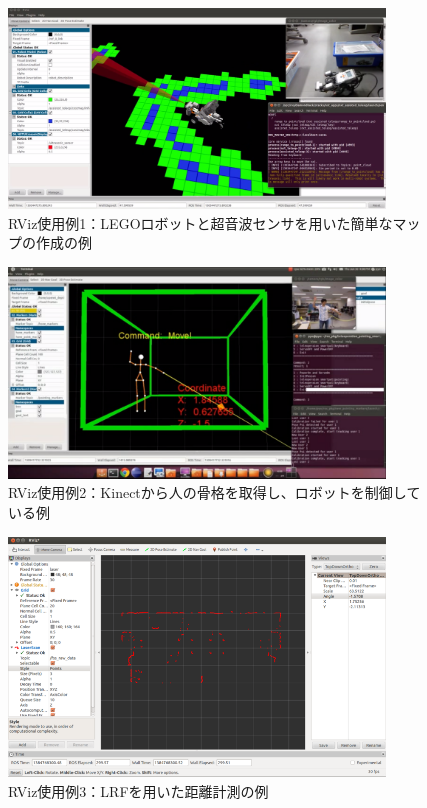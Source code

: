 \begin{figure}[h]
  \centering
  \includegraphics[width=10cm]{pictures/chapter5/pic_05_01.png}
  \caption{RViz使用例1：LEGOロボットと超音波センサを用いた簡単なマップの作成の例}
\end{figure}

\begin{figure}[h]
  \centering
  \includegraphics[width=10cm]{pictures/chapter5/pic_05_02.png}
  \caption{RViz使用例2：Kinectから人の骨格を取得し、ロボットを制御している例}
\end{figure}

\begin{figure}[h]
  \centering
  \includegraphics[width=10cm]{pictures/chapter5/pic_05_03.png}
  \caption{RViz使用例3：LRFを用いた距離計測の例}
\end{figure}

